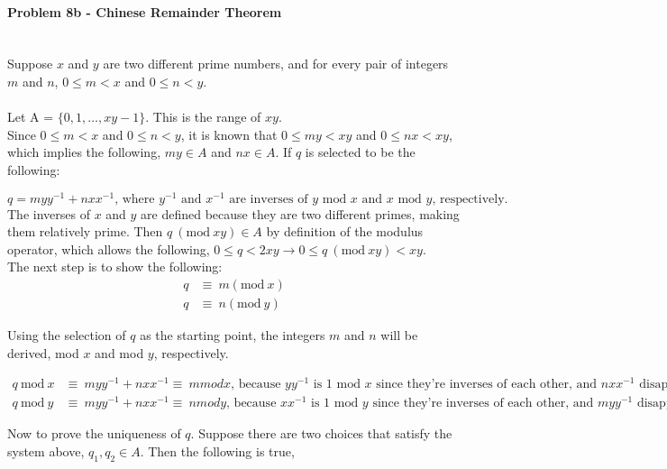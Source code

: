 \documentclass[fleqn]{article}
\begin{document}
\pagebreak
\paragraph{Problem 8b - Chinese Remainder Theorem} ~\\
Suppose $x$ and $y$ are two different prime numbers, and for every pair of integers $m$ and $n$, $0 \le m < x$ and $0 \le n < y$. \\\\
\noindent
Let A = $\{0, 1, \dots, xy - 1\}$. This is the range of $xy$.\\

\noindent
Since $0 \le m < x$ and $0 \le n < y$, it is known that $0 \le my < xy$ and $0 \le nx < xy$, which implies the following, $my \in A$ and $nx \in A$.  If $q$ is selected to be the following: 

\begin{equation*}
q = myy^{-1} + nxx^{-1} \text{, where $y^{-1}$ and $x^{-1}$ are inverses of $y$ mod $x$ and $x$ mod $y$, respectively.}
\end{equation*}
The inverses of $x$ and $y$ are defined because they are two different primes, making them relatively prime.  Then $q\ (\textrm{mod}\ xy) \in A$ by definition of the modulus operator, which allows the following, $0 \le q < 2xy \rightarrow 0 \le q\ (\textrm{mod}\ xy) < xy$. \\

\noindent
The next step is to show the following:
\begin{align*}
q &\equiv\ m (\textrm{mod}\ x) \\
q &\equiv\ n (\textrm{mod}\ y)
\end{align*}

\noindent
Using the selection of $q$ as the starting point, the integers $m$ and $n$ will be derived, mod $x$ and mod $y$, respectively.

\begin{align*}
q\ \textrm{mod}\ x &\equiv\ myy^{-1} + nxx^{-1} \equiv\ m mod x \text{, because $yy^{-1}$ is $1$ mod $x$ since they're inverses of each other, and $nxx^{-1}$ disappears.}\\
q\ \textrm{mod}\ y &\equiv\ myy^{-1} + nxx^{-1} \equiv\ n mod y \text {, because $xx^{-1}$ is $1$ mod $y$ since they're inverses of each other, and $myy^{-1}$ disappears.}
\end{align*}

\noindent
Now to prove the uniqueness of $q$.  Suppose there are two choices that satisfy the system above, $q_1, q_2 \in A$.  Then the following is true,
\end{document}
